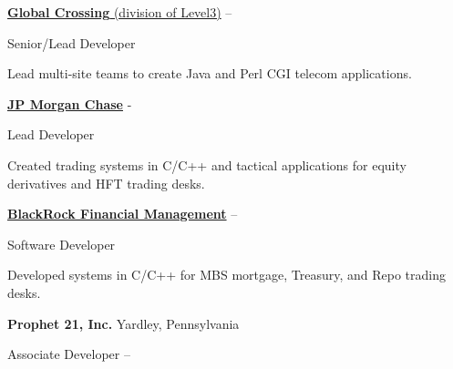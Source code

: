 \documentclass[letterpaper,MMMMyyyy,nonstopmode]{simpleresumecv}
\newif\ifLOCATION
\begin{document}
\begin{Body}
\BigGap
\Entry
\href{http://www.globalcrossing.com/}
{\textbf{Global  Crossing} (division of Level3)}
\hfill 
 -- 

Senior/Lead Developer
\ifLOCATION
\hfill
Rochester, New York
\fi

\begin{Detail}
\Item
Lead multi-site teams to create Java and Perl CGI telecom applications.

\end{Detail}

\BigGap
\Entry
\href{http://www.jpmorganchase.com/}
{\textbf{JP Morgan Chase}}
\hfill 
 - 

Lead Developer
\ifLOCATION
\hfill
New York, New York
\fi

\begin{Detail}
\Item
Created trading systems in C/C++ and tactical applications for equity derivatives and HFT trading desks.

\end{Detail}

\BigGap
\Entry
\href{http://www.blackrock.com/}
{\textbf{BlackRock Financial Management}}
\hfill 
 --  

Software Developer
\ifLOCATION
\hfill
New York, New York
\fi

\begin{Detail}
\Item
Developed systems in C/C++ for MBS mortgage, Treasury, and Repo trading desks.
\end{Detail}

\iffalse
\BigGap
\Entry
\textbf{Prophet 21, Inc.}
\hfill 
Yardley, Pennsylvania

Associate Developer
\hfill
{} --  


\end{Body}
\end{document}
